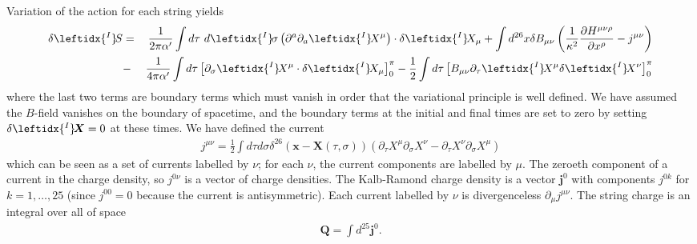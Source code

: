 \documentclass{revtex4}
\newcommand{\be}{\begin{eqnarray}}
\newcommand{\ee}{\end{eqnarray}}
\def\X{\bm{X}}
\def\lI{\leftidx{^I} \! }
\begin{document}
Variation of the action for each string yields
\be
\delta \lI S &=& \frac{1}{2 \pi \alpha' } \int d\tau \ d \lI \sigma \left( \partial^a \partial_a \lI X^\mu \right) \cdot \delta \lI X_\mu
+ \int d^{26} x \delta B_{\mu \nu} \left(\frac{1}{\kappa^2} \frac{\partial H^{\mu \nu \rho}}{\partial x^\rho} - j^{\mu \nu} \right) \nonumber \\
&-& \frac{1}{4 \pi \alpha' } \int d \tau \left[ \partial_{\sigma} \lI X^\mu \cdot \delta \lI X_\mu \right]_{0}^{\pi} - \frac{1}{2} \int d \tau \left[ B_{\mu \nu} \partial_\tau \lI X^\mu \delta \lI X^\nu \right]_0^{\pi}
\label{varS}
\ee
where the last two terms are boundary terms which must vanish in order that the variational principle is well defined. We have assumed the $B$-field vanishes on the boundary of spacetime, and the boundary terms at the initial and final times are set to zero by setting $\delta \lI \X = 0$ at these times. We have defined the current
\be
j^{\mu \nu} = \frac{1}{2} \int d \tau d \sigma \delta^{26}(\bm{x} - \X (\tau, \sigma)) \left( \partial_\tau X^\mu \partial_\sigma X^\nu - 
\partial_\tau X^\nu \partial_\sigma X^\mu \right)
\ee
which can be seen as a set of currents labelled by $\nu$; for each $\nu$, the current components are labelled by $\mu$. The zeroeth component of a current in the charge density, so  $j^{0 \nu}$ is a vector of charge densities. The Kalb-Ramond charge density is a vector $\bm{j}^0$ with components $j^{0 k}$ for $k = 1, \ldots, 25$ (since $j^{00} = 0$ because the current is antisymmetric).
Each current labelled by $\nu$ is divergenceless $\partial_\mu j^{\mu \nu}$. The string charge is an integral over all of space
\be
\bm{Q} = \int d^{25} \bm{j}^0 .
\ee
\end{document}
